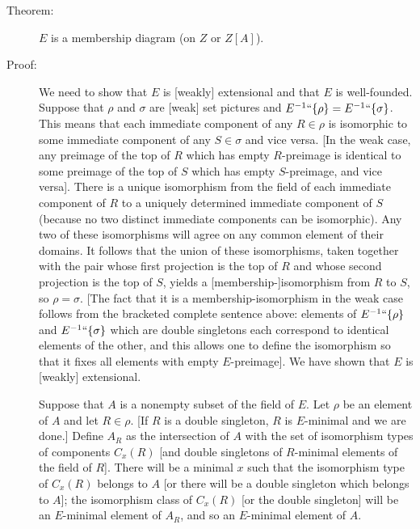 \documentclass[12pt]{book}
\begin{document}
\begin{description}
\item[Theorem:]  $E$ is a membership diagram (on $Z$ or $Z[A]$).

\item[Proof:] We need to show that $E$ is [weakly] extensional and
that $E$ is well-founded.  Suppose that $\rho$ and $\sigma$ are [weak]
set pictures and $E^{-1}``\{\rho\} = E^{-1}``\{\sigma\}$.  This means
that each immediate component of any $R\in \rho$ is isomorphic to some
immediate component of any $S\in \sigma$ and vice versa. [In the weak
case, any preimage of the top of $R$ which has empty $R$-preimage is
identical to some preimage of the top of $S$ which has empty
$S$-preimage, and vice versa].  There is a unique isomorphism from the
field of each immediate component of $R$ to a uniquely determined
immediate component of $S$ (because no two distinct immediate
components can be isomorphic).  Any two of these isomorphisms will
agree on any common element of their domains.  It follows that the
union of these isomorphisms, taken together with the pair whose first
projection is the top of $R$ and whose second projection is the top of
$S$, yields a [membership-]isomorphism from $R$ to $S$, so
$\rho=\sigma$.  [The fact that it is a membership-isomorphism in the
weak case follows from the bracketed complete sentence above: elements
of $E^{-1}``\{\rho\}$ and $E^{-1}``\{\sigma\}$ which are double
singletons each correspond to identical elements of the other, and
this allows one to define the isomorphism so that it fixes all
elements with empty $E$-preimage].  We have shown that $E$ is [weakly]
extensional.

Suppose that $A$ is a nonempty subset of the field of $E$.  Let $\rho$
be an element of $A$ and let $R \in \rho$.  [If $R$ is a double
singleton, $R$ is $E$-minimal and we are done.]  Define $A_R$ as the
intersection of $A$ with the set of isomorphism types of components
$C_x(R)$ [and double singletons of $R$-minimal elements of the field of
$R$].  There will be a minimal $x$ such that the isomorphism type of
$C_x(R)$ belongs to $A$ [or there will be a double singleton which
belongs to $A$]; the isomorphism class of $C_x(R)$ [or the double
singleton] will be an $E$-minimal element of $A_R$, and so an
$E$-minimal element of $A$.


\end{description}
\end{document}
